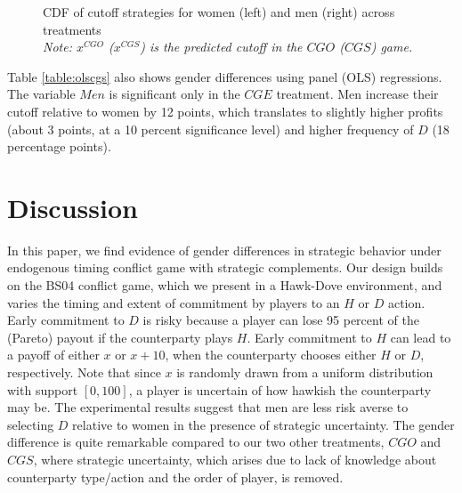 \documentclass[12pt,english]{article}
\begin{document}
\begin{center}
\begin{figure}[ht]
\begin{minipage}[t]{0.45\columnwidth}
\end{minipage} 
\caption{CDF of cutoff strategies for women (left) and men (right) across treatments\\\footnotesize{\textit{Note: $x^{CGO}$ ($x^{CGS}$) is the predicted cutoff in the $CGO$ ($CGS$) game.}}}
\label{fig:cdfall}\end{figure}
\par\end{center}

Table \ref{table:olscgs} also shows gender differences using panel (OLS) regressions. The variable $Men$ is significant only in the $CGE$ treatment. Men increase their cutoff relative to women by 12 points, which translates to slightly higher profits (about 3 points, at a 10 percent significance level) and higher frequency of $D$ (18 percentage points).

\section{Discussion}
\label{sec:discuss}

In this paper, we find evidence of gender differences in strategic behavior under endogenous timing conflict game with strategic complements. Our design builds on the BS04 conflict game, which we present in a Hawk-Dove environment, and varies the timing and extent of commitment by players to an $H$ or $D$ action. Early commitment to $D$ is risky because a player can lose 95 percent of the (Pareto) payout if the counterparty plays $H$. Early commitment to $H$ can lead to a payoff of either $x$ or $x+10$, when the counterparty chooses either $H$ or $D$, respectively.  Note that since  $x$ is randomly drawn from a uniform distribution with support $[0,100]$, a player is uncertain of how hawkish the counterparty may be. The experimental results suggest that men are less risk averse to selecting $D$ relative to women in the presence of strategic uncertainty. The gender difference is quite remarkable compared to our two other treatments, $CGO$ and $CGS$, where strategic uncertainty, which arises due to lack of knowledge about counterparty type/action and the order of player, is removed.
\end{document}
